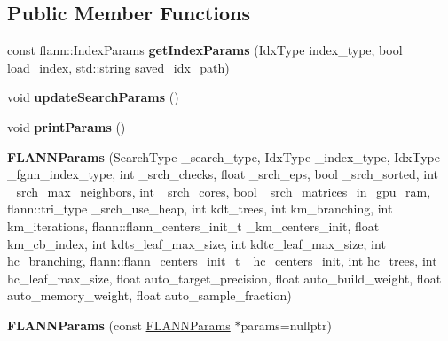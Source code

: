 \subsection*{Public Member Functions}
\begin{DoxyCompactItemize}
\item 
\hypertarget{structFLANNParams_af057c64b9666dcfe76b36a35c8767b12}{const flann\-::\-Index\-Params {\bfseries get\-Index\-Params} (Idx\-Type index\-\_\-type, bool load\-\_\-index, std\-::string saved\-\_\-idx\-\_\-path)}\label{structFLANNParams_af057c64b9666dcfe76b36a35c8767b12}

\item 
\hypertarget{structFLANNParams_a76d83b50e5744e1eeb5a2ab2771ed5cb}{void {\bfseries update\-Search\-Params} ()}\label{structFLANNParams_a76d83b50e5744e1eeb5a2ab2771ed5cb}

\item 
\hypertarget{structFLANNParams_acbd7e2aed4b61964b73a6a67a2508a18}{void {\bfseries print\-Params} ()}\label{structFLANNParams_acbd7e2aed4b61964b73a6a67a2508a18}

\item 
\hypertarget{structFLANNParams_a89d32c36efa37f5cf274595609ee4203}{{\bfseries F\-L\-A\-N\-N\-Params} (Search\-Type \-\_\-search\-\_\-type, Idx\-Type \-\_\-index\-\_\-type, Idx\-Type \-\_\-fgnn\-\_\-index\-\_\-type, int \-\_\-srch\-\_\-checks, float \-\_\-srch\-\_\-eps, bool \-\_\-srch\-\_\-sorted, int \-\_\-srch\-\_\-max\-\_\-neighbors, int \-\_\-srch\-\_\-cores, bool \-\_\-srch\-\_\-matrices\-\_\-in\-\_\-gpu\-\_\-ram, flann\-::tri\-\_\-type \-\_\-srch\-\_\-use\-\_\-heap, int kdt\-\_\-trees, int km\-\_\-branching, int km\-\_\-iterations, flann\-::flann\-\_\-centers\-\_\-init\-\_\-t \-\_\-km\-\_\-centers\-\_\-init, float km\-\_\-cb\-\_\-index, int kdts\-\_\-leaf\-\_\-max\-\_\-size, int kdtc\-\_\-leaf\-\_\-max\-\_\-size, int hc\-\_\-branching, flann\-::flann\-\_\-centers\-\_\-init\-\_\-t \-\_\-hc\-\_\-centers\-\_\-init, int hc\-\_\-trees, int hc\-\_\-leaf\-\_\-max\-\_\-size, float auto\-\_\-target\-\_\-precision, float auto\-\_\-build\-\_\-weight, float auto\-\_\-memory\-\_\-weight, float auto\-\_\-sample\-\_\-fraction)}\label{structFLANNParams_a89d32c36efa37f5cf274595609ee4203}

\item 
\hypertarget{structFLANNParams_a7cf9587b5e4aee0dece845dc54ab76f3}{{\bfseries F\-L\-A\-N\-N\-Params} (const \hyperlink{structFLANNParams}{F\-L\-A\-N\-N\-Params} $\ast$params=nullptr)}\label{structFLANNParams_a7cf9587b5e4aee0dece845dc54ab76f3}

\end{DoxyCompactItemize}
